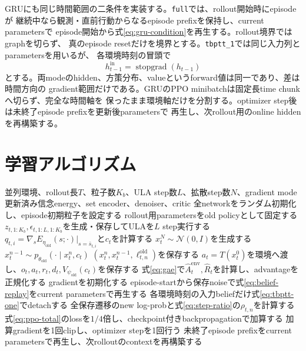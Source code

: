 \documentclass[a4paper,11pt]{article}
\newcommand{\stopgrad}{\operatorname{stopgrad}}
\newcommand{\Normal}{\mathcal{N}}
\newcommand{\old}{\mathrm{old}}
\newcommand{\env}{\mathrm{env}}
\begin{document}
GRUにも同じ時間範囲の二条件を実装する。\texttt{full}では、rollout開始時にepisodeが
継続中なら観測・直前行動からなるepisode prefixを保持し、current parametersで
episode開始から式\eqref{eq:gru-condition}を再生する。rollout境界ではgraphを切らず、
真のepisode resetだけを境界とする。\texttt{tbptt\_1}では同じ入力列とparametersを用いるが、
各環境時刻の冒頭で
\begin{equation}
  h^{\mathrm{in}}_{t-1}=\stopgrad(h_{t-1})
  \label{eq:gru-tbptt-one}
\end{equation}
とする。両modeのhidden、方策分布、valueというforward値は同一であり、差は時間方向の
gradient範囲だけである。GRUのPPO minibatchは固定長time chunkへ切らず、完全な時間軸を
保ったまま環境軸だけを分割する。optimizer step後は未終了episode prefixを更新後parametersで
再生し、次rollout用のonline hiddenを再構築する。

\section{学習アルゴリズム}

\begin{algorithm}[H]
\small
\caption{Belief-conditioned DDPM policyのDPPO型from-scratch学習}
\label{alg:training}
\begin{algorithmic}[1]
\Require 並列環境、rollout長$T$、粒子数$K_b$、ULA step数$L$、拡散step数$N$、gradient mode
\Ensure 更新済み信念energy、set encoder、denoiser、critic
\State 全networkをランダム初期化し、episode初期粒子を設定する
  \State rollout用parametersをold policyとして固定する
    \State $z_{t,1:K_b},\epsilon_{t,1:L,1:K_b}$を生成・保存してULAを$L$ step実行する
    \State $q_{t,i}=\nabla_sE_{\eta_{\old}}(s;\cdot)|_{s=\bar s_{t,i}}$と$c_t$を計算する
    \State $x_t^N\sim\Normal(0,I)$を生成する
      \State $x_t^{n-1}\sim p_{\theta_{\old}}(\cdot\mid x_t^n,c_t)$
      \State $(x_t^n,x_t^{n-1},\ell^{\old}_{t,n})$を保存する
    \EndFor
    \State $a_t=T(x_t^0)$を環境へ渡し、$o_t,a_t,r_t,d_t,V_{\psi_{\old}}(c_t)$を保存する
  \EndFor
  \State 式\eqref{eq:gae}で$\widehat A_t^{\env},\widehat R_t$を計算し、advantageを正規化する
    \State gradientを初期化する
      \State episode-startから保存noiseで式\eqref{eq:belief-replay}をcurrent parametersで再生する
        \State 各環境時刻の入力beliefだけ式\eqref{eq:tbptt-one}でdetachする
      \EndIf
      \State 全保存遷移のnew log-probと式\eqref{eq:step-ratio}の$\rho_{t,n}$を計算する
      \State 式\eqref{eq:ppo-total}のlossを$1/4$倍し、checkpoint付きbackpropagationで加算する
    \EndFor
    \State 加算gradientを1回clipし、optimizer stepを1回行う
  \EndFor
  \State 未終了episode prefixをcurrent parametersで再生し、次rolloutのcontextを再構築する
\EndFor
\end{algorithmic}
\end{algorithm}
\end{document}
